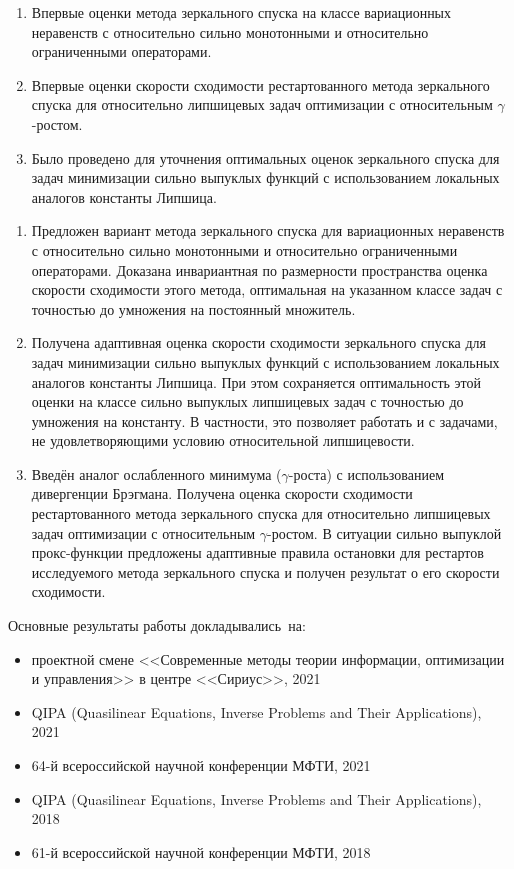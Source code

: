 {\novelty}
\begin{enumerate}[beginpenalty=10000] %
  \item Впервые  оценки метода зеркального спуска на классе вариационных неравенств с относительно сильно монотонными и относительно ограниченными операторами.
  \item Впервые  оценки скорости сходимости рестартованного метода зеркального спуска для относительно липшицевых задач оптимизации с относительным $\gamma$-ростом.
  \item Было проведено  для уточнения оптимальных оценок зеркального спуска для задач минимизации сильно выпуклых функций с использованием локальных аналогов константы Липшица. 
\end{enumerate}

{}
\begin{enumerate}[beginpenalty=10000] %
  \item Предложен вариант метода зеркального спуска для вариационных неравенств с относительно сильно монотонными и относительно ограниченными операторами. Доказана инвариантная по размерности пространства оценка скорости сходимости этого метода, оптимальная на указанном классе задач с точностью до умножения на постоянный множитель.
  \item Получена адаптивная оценка скорости сходимости зеркального спуска для задач минимизации сильно выпуклых функций с использованием локальных аналогов константы Липшица. При этом сохраняется оптимальность этой оценки на классе сильно выпуклых липшицевых задач с точностью до умножения на константу. В частности, это позволяет работать и с задачами, не удовлетворяющими условию относительной липшицевости.
  \item Введён аналог ослабленного минимума ($\gamma$-роста) с использованием дивергенции Брэгмана. Получена оценка скорости сходимости рестартованного метода зеркального спуска для относительно липшицевых задач оптимизации с относительным $\gamma$-ростом. В ситуации сильно выпуклой прокс-функции предложены адаптивные правила остановки для рестартов исследуемого метода зеркального спуска и получен результат о его скорости сходимости.
\end{enumerate}

{\probation}
Основные результаты работы докладывались~на:
\begin{itemize}
    \item проектной смене <<Современные методы теории информации, оптимизации и управления>> в центре <<Сириус>>, 2021
    \item QIPA (Quasilinear Equations, Inverse Problems and Their Applications), 2021
    \item 64-й всероссийской научной конференции МФТИ, 2021
    \item QIPA (Quasilinear Equations, Inverse Problems and Their Applications), 2018
    \item 61-й всероссийской научной конференции МФТИ, 2018
\end{itemize}

